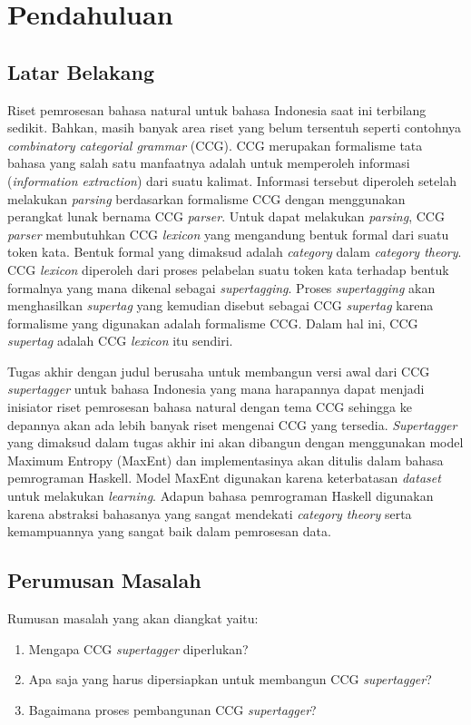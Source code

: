 \chapter{Pendahuluan}
\section{Latar Belakang}

Riset pemrosesan bahasa natural untuk bahasa Indonesia saat ini terbilang sedikit.
Bahkan, masih banyak area riset yang belum tersentuh seperti contohnya
\textit{combinatory categorial grammar} (CCG).
CCG merupakan formalisme tata bahasa yang salah satu manfaatnya adalah untuk memperoleh informasi
(\textit{information extraction}) dari suatu kalimat.
Informasi tersebut diperoleh setelah melakukan \textit{parsing} berdasarkan formalisme CCG dengan
menggunakan perangkat lunak bernama CCG \textit{parser}.
Untuk dapat melakukan \textit{parsing}, CCG \textit{parser} membutuhkan CCG \textit{lexicon}
yang mengandung bentuk formal dari suatu token kata.
Bentuk formal yang dimaksud adalah \textit{category} dalam \textit{category theory}.
CCG \textit{lexicon} diperoleh dari proses pelabelan suatu token kata terhadap bentuk formalnya yang
mana dikenal sebagai \textit{supertagging}.
Proses \textit{supertagging} akan menghasilkan \textit{supertag} yang kemudian disebut sebagai CCG
\textit{supertag} karena formalisme yang digunakan adalah formalisme CCG.
Dalam hal ini, CCG \textit{supertag} adalah CCG \textit{lexicon} itu sendiri.

Tugas akhir dengan judul \say{\Title} berusaha untuk membangun versi awal dari CCG
\textit{supertagger} untuk bahasa Indonesia yang mana harapannya dapat menjadi inisiator riset
pemrosesan bahasa natural dengan tema CCG sehingga ke depannya akan ada lebih banyak riset
mengenai CCG yang tersedia.
\textit{Supertagger} yang dimaksud dalam tugas akhir ini akan dibangun dengan menggunakan model
Maximum Entropy (MaxEnt) dan implementasinya akan ditulis dalam bahasa pemrograman Haskell.
Model MaxEnt digunakan karena keterbatasan \textit{dataset} untuk melakukan \textit{learning}.
Adapun bahasa pemrograman Haskell digunakan karena abstraksi bahasanya yang sangat mendekati
\textit{category theory} serta kemampuannya yang sangat baik dalam pemrosesan data.

\section{Perumusan Masalah}
Rumusan masalah yang akan diangkat yaitu:
\begin{enumerate}
    \item Mengapa CCG \textit{supertagger} diperlukan?
    \item Apa saja yang harus dipersiapkan untuk membangun CCG \textit{supertagger}?
    \item Bagaimana proses pembangunan CCG \textit{supertagger}?
\end{enumerate}

